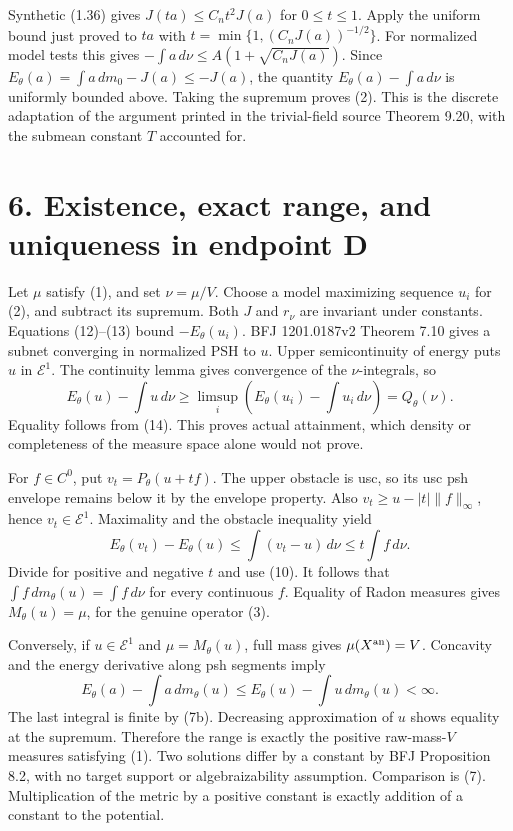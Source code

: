 \documentclass[11pt]{article}
\begin{document}
Synthetic (1.36) gives \(J(ta)\leq C_nt^2J(a)\) for \(0\leq t\leq1\). Apply the uniform bound just proved to \(ta\) with \(t=\min\{1,(C_nJ(a))^{-1/2}\}\). For normalized model tests this gives \(-\int a\,d\nu\leq A(1+\sqrt{C_nJ(a)})\). Since \(E_\theta(a)=\int a\,dm_0-J(a)\leq-J(a)\), the quantity \(E_\theta(a)-\int a\,d\nu\) is uniformly bounded above. Taking the supremum proves (2). This is the discrete adaptation of the argument printed in the trivial-field source Theorem 9.20, with the submean constant \(T\) accounted for.

\section*{6. Existence, exact range, and uniqueness in endpoint D}

Let \(\mu\) satisfy (1), and set \(\nu=\mu/V\). Choose a model maximizing sequence \(u_i\) for (2), and subtract its supremum. Both \(J\) and \(r_\nu\) are invariant under constants. Equations (12)--(13) bound \(-E_\theta(u_i)\). BFJ 1201.0187v2 Theorem 7.10 gives a subnet converging in normalized PSH to \(u\). Upper semicontinuity of energy puts \(u\) in \(\mathcal E^1\). The continuity lemma gives convergence of the \(\nu\)-integrals, so
\[
 E_\theta(u)-\int u\,d\nu
 \geq\limsup_i\left(E_\theta(u_i)-\int u_i\,d\nu\right)
 =Q_\theta(\nu).
 \tag{16}
\]
Equality follows from (14). This proves actual attainment, which density or completeness of the measure space alone would not prove.

For \(f\in C^0\), put \(v_t=P_\theta(u+tf)\). The upper obstacle is usc, so its usc psh envelope remains below it by the envelope property. Also \(v_t\geq u-|t|\|f\|_\infty\), hence \(v_t\in\mathcal E^1\). Maximality and the obstacle inequality yield
\[
 E_\theta(v_t)-E_\theta(u)
 \leq\int(v_t-u)\,d\nu\leq t\int f\,d\nu.
 \tag{17}
\]
Divide for positive and negative \(t\) and use (10). It follows that \(\int f\,dm_\theta(u)=\int f\,d\nu\) for every continuous \(f\). Equality of Radon measures gives \(M_\theta(u)=\mu\), for the genuine operator (3).

Conversely, if \(u\in\mathcal E^1\) and \(\mu=M_\theta(u)\), full mass gives \(\mu(X^{\rm an})=V\). Concavity and the energy derivative along psh segments imply
\[
 E_\theta(a)-\int a\,dm_\theta(u)
 \leq E_\theta(u)-\int u\,dm_\theta(u)<\infty.
\]
The last integral is finite by (7b). Decreasing approximation of \(u\) shows equality at the supremum. Therefore the range is exactly the positive raw-mass-\(V\) measures satisfying (1). Two solutions differ by a constant by BFJ Proposition 8.2, with no target support or algebraizability assumption. Comparison is (7). Multiplication of the metric by a positive constant is exactly addition of a constant to the potential.
\end{document}

